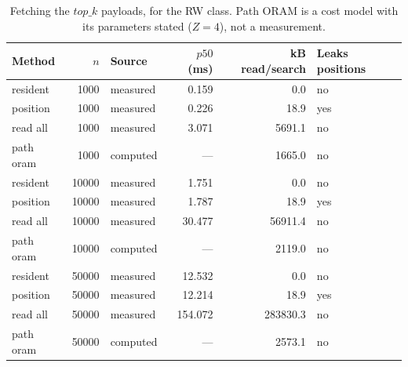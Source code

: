 \begin{table}[t]
\centering
\caption{Fetching the $top\_k$ payloads, for the RW class. Path ORAM is a cost model with its
parameters stated ($Z=4$), not a measurement.}
\label{tab:e12}
\small
\setlength{\tabcolsep}{4pt}
\begin{tabular}{lrlrrl}
\toprule
Method & $n$ & Source & $p50$ (ms) & kB read/search & Leaks positions \\
\midrule
resident & 1000 & measured & 0.159 & 0.0 & no \\
position & 1000 & measured & 0.226 & 18.9 & yes \\
read all & 1000 & measured & 3.071 & 5691.1 & no \\
path oram & 1000 & computed & --- & 1665.0 & no \\
resident & 10000 & measured & 1.751 & 0.0 & no \\
position & 10000 & measured & 1.787 & 18.9 & yes \\
read all & 10000 & measured & 30.477 & 56911.4 & no \\
path oram & 10000 & computed & --- & 2119.0 & no \\
resident & 50000 & measured & 12.532 & 0.0 & no \\
position & 50000 & measured & 12.214 & 18.9 & yes \\
read all & 50000 & measured & 154.072 & 283830.3 & no \\
path oram & 50000 & computed & --- & 2573.1 & no \\
\bottomrule
\end{tabular}
\end{table}

